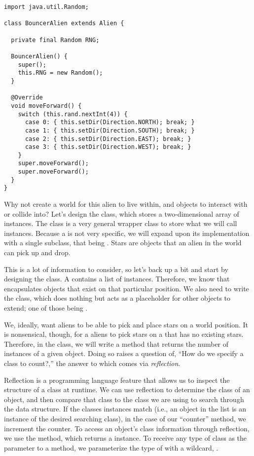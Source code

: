 \begin{lstlisting}[language=MyJava]
import java.util.Random;

class BouncerAlien extends Alien {

  private final Random RNG;

  BouncerAlien() {
    super();
    this.RNG = new Random();
  }

  @Override
  void moveForward() {
    switch (this.rand.nextInt(4)) {
      case 0: { this.setDir(Direction.NORTH); break; }
      case 1: { this.setDir(Direction.SOUTH); break; }
      case 2: { this.setDir(Direction.EAST); break; }
      case 3: { this.setDir(Direction.WEST); break; }
    }
    super.moveForward();
    super.moveForward();
  }
}
\end{lstlisting}

Why not create a world for this alien to live within, and objects to interact with or collide into? Let's design the  class, which stores a two-dimensional array of  instances. The  class is a very general wrapper class to store what we will call  instances. Because a  is not very specific, we will expand upon its implementation with a single subclass, that being . Stars are objects that an alien in the world can pick up and drop. 

This is a lot of information to consider, so let's back up a bit and start by designing the  class. A  contains a list of  instances. Therefore, we know that  encapsulates objects that exist on that particular position. We also need to write the  class, which does nothing but acts as a placeholder for other objects to extend; one of those being .

We, ideally, want aliens to be able to pick and place stars on a world position. It is nonsensical, though, for a aliens to pick stars on a  that has no existing stars. Therefore, in the  class, we will write a method that returns the number of instances of a given object. Doing so raises a question of, ``How do we specify a class to count?,'' the answer to which comes via \emph{reflection}. 

Reflection is a programming language feature that allows us to inspect the structure of a class at runtime. We can use reflection to determine the class of an object, and then compare that class to the class we are using to search through the data structure. If the classes instances match (i.e., an object in the list is an instance of the desired searching class), in the case of our ``counter'' method, we increment the counter. To access an object's class information through reflection, we use the  method, which returns a  instance. To receive any type of class as the parameter to a method, we parameterize the type of  with a wildcard, .

